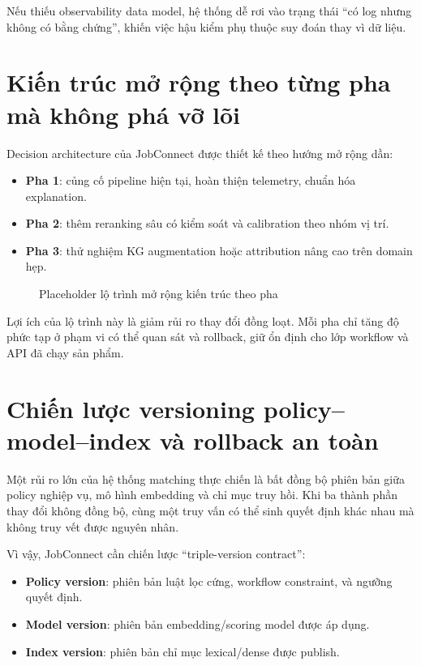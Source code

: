 Nếu thiếu observability data model, hệ thống dễ rơi vào trạng thái ``có log nhưng không có bằng chứng'', khiến việc hậu kiểm phụ thuộc suy đoán thay vì dữ liệu.

\section{Kiến trúc mở rộng theo từng pha mà không phá vỡ lõi}

Decision architecture của JobConnect được thiết kế theo hướng mở rộng dần:

\begin{itemize}
  \item \textbf{Pha 1}: củng cố pipeline hiện tại, hoàn thiện telemetry, chuẩn hóa explanation.
  \item \textbf{Pha 2}: thêm reranking sâu có kiểm soát và calibration theo nhóm vị trí.
  \item \textbf{Pha 3}: thử nghiệm KG augmentation hoặc attribution nâng cao trên domain hẹp.
\end{itemize}

\begin{figure}[H]
\centering
{}
\caption{Placeholder lộ trình mở rộng kiến trúc theo pha}
\label{fig:architecture-phased-evolution-placeholder}
\end{figure}

Lợi ích của lộ trình này là giảm rủi ro thay đổi đồng loạt. Mỗi pha chỉ tăng độ phức tạp ở phạm vi có thể quan sát và rollback, giữ ổn định cho lớp workflow và API đã chạy sản phẩm.

\section{Chiến lược versioning policy--model--index và rollback an toàn}

Một rủi ro lớn của hệ thống matching thực chiến là bất đồng bộ phiên bản giữa policy nghiệp vụ, mô hình embedding và chỉ mục truy hồi. Khi ba thành phần thay đổi không đồng bộ, cùng một truy vấn có thể sinh quyết định khác nhau mà không truy vết được nguyên nhân.

Vì vậy, JobConnect cần chiến lược ``triple-version contract'':
\begin{itemize}
  \item \textbf{Policy version}: phiên bản luật lọc cứng, workflow constraint, và ngưỡng quyết định.
  \item \textbf{Model version}: phiên bản embedding/scoring model được áp dụng.
  \item \textbf{Index version}: phiên bản chỉ mục lexical/dense được publish.
\end{itemize}

